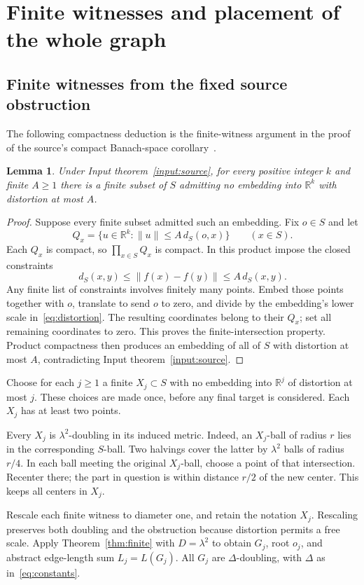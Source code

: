 \documentclass[11pt,a4paper]{article}
\newtheorem{lemma}[theorem]{Lemma}
\theoremstyle{definition}
\theoremstyle{remark}
\numberwithin{equation}{section}
\newcommand{\R}{\mathbb R}
\newcommand{\norm}[1]{\lVert #1\rVert}
\begin{document}
\section{Finite witnesses and placement of the whole graph}
\subsection{Finite witnesses from the fixed source obstruction}
The following compactness deduction is the finite-witness argument in the proof of the source's compact Banach-space corollary~\cite{OpenAI}.
\begin{lemma}\label{lem:witness}
Under Input theorem~\ref{input:source}, for every positive integer $k$ and finite $A\ge1$ there is a finite subset of $S$ admitting no embedding into $\R^k$ with distortion at most $A$.
\end{lemma}
\begin{proof}
Suppose every finite subset admitted such an embedding. Fix $o\in S$ and let
\[
 Q_x=\{u\in\R^k:\norm u\le A\,d_S(o,x)\}\qquad(x\in S).
\]
Each $Q_x$ is compact, so $\prod_{x\in S}Q_x$ is compact. In this product impose the closed constraints
\[
 d_S(x,y)\le\norm{f(x)-f(y)}\le A\,d_S(x,y).
\]
Any finite list of constraints involves finitely many points. Embed those points together with $o$, translate to send $o$ to zero, and divide by the embedding's lower scale in~\eqref{eq:distortion}. The resulting coordinates belong to their $Q_x$; set all remaining coordinates to zero. This proves the finite-intersection property. Product compactness then produces an embedding of all of $S$ with distortion at most $A$, contradicting Input theorem~\ref{input:source}.
\end{proof}
Choose for each $j\ge1$ a finite $X_j\subset S$ with no embedding into $\R^j$ of distortion at most $j$. These choices are made once, before any final target is considered. Each $X_j$ has at least two points.

Every $X_j$ is $\lambda^2$-doubling in its induced metric. Indeed, an $X_j$-ball of radius $r$ lies in the corresponding $S$-ball. Two halvings cover the latter by $\lambda^2$ balls of radius $r/4$. In each ball meeting the original $X_j$-ball, choose a point of that intersection. Recenter there; the part in question is within distance $r/2$ of the new center. This keeps all centers in $X_j$.

Rescale each finite witness to diameter one, and retain the notation $X_j$. Rescaling preserves both doubling and the obstruction because distortion permits a free scale. Apply Theorem~\ref{thm:finite} with $D=\lambda^2$ to obtain $G_j$, root $o_j$, and abstract edge-length sum $L_j=L(G_j)$. All $G_j$ are $\Delta$-doubling, with $\Delta$ as in~\eqref{eq:constants}.
\end{document}
